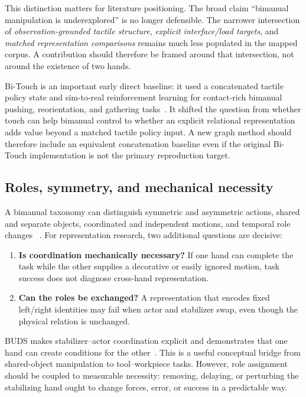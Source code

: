 This distinction matters for literature positioning. The broad claim ``bimanual
manipulation is underexplored'' is no longer defensible. The narrower intersection
of \emph{observation-grounded tactile structure}, \emph{explicit interface/load
targets}, and \emph{matched representation comparisons} remains much less
populated in the mapped corpus. A contribution should therefore be framed around
that intersection, not around the existence of two hands.

Bi-Touch is an important early direct baseline: it used a concatenated tactile
policy state and sim-to-real reinforcement learning for contact-rich bimanual
pushing, reorientation, and gathering tasks~\cite{bitouch2023}. It shifted the question from whether
touch can help bimanual control to whether an explicit relational representation
adds value beyond a matched tactile policy input. A new graph method should
therefore include an equivalent concatenation baseline even if the original
Bi-Touch implementation is not the primary reproduction target.

\subsection{Roles, symmetry, and mechanical necessity}

A bimanual taxonomy can distinguish symmetric and asymmetric actions, shared and
separate objects, coordinated and independent motions, and temporal role changes
~\cite{krebs2022taxonomy}. For representation research, two additional questions
are decisive:

\begin{enumerate}
  \item \textbf{Is coordination mechanically necessary?} If one hand can complete
  the task while the other supplies a decorative or easily ignored motion, task
  success does not diagnose cross-hand representation.
  \item \textbf{Can the roles be exchanged?} A representation that encodes fixed
  left/right identities may fail when actor and stabilizer swap, even though the
  physical relation is unchanged.
\end{enumerate}

BUDS makes stabilizer--actor coordination explicit and demonstrates that one hand
can create conditions for the other~\cite{grannen2023stabilize}. This is a useful
conceptual bridge from shared-object manipulation to tool--workpiece tasks.
However, role assignment should be coupled to measurable necessity: removing,
delaying, or perturbing the stabilizing hand ought to change forces, error, or
success in a predictable way.

